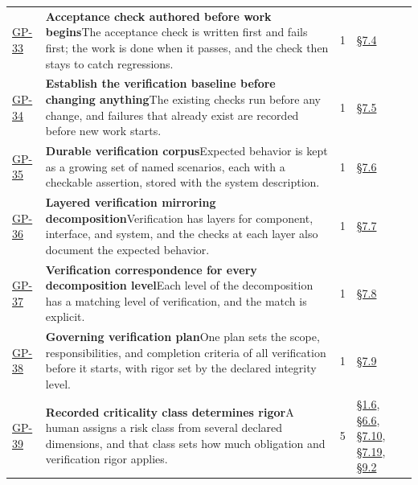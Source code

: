 \begin{longtable}{@{}p{} p{} r p{}@{}}
\hyperlink{gp-33}{GP-33}\hypertarget{gp-33}{} & \textbf{Acceptance check authored before work begins}\newline The acceptance check is written first and fails first; the work is done when it passes, and the check then stays to catch regressions.\rule[-\normalbaselineskip]{0pt}{0pt} & 1 & \hyperlink{nss-7.4}{\S7.4}\rule[-\normalbaselineskip]{0pt}{0pt} \\
\hyperlink{gp-34}{GP-34}\hypertarget{gp-34}{} & \textbf{Establish the verification baseline before changing anything}\newline The existing checks run before any change, and failures that already exist are recorded before new work starts.\rule[-\normalbaselineskip]{0pt}{0pt} & 1 & \hyperlink{nss-7.5}{\S7.5}\rule[-\normalbaselineskip]{0pt}{0pt} \\
\hyperlink{gp-35}{GP-35}\hypertarget{gp-35}{} & \textbf{Durable verification corpus}\newline Expected behavior is kept as a growing set of named scenarios, each with a checkable assertion, stored with the system description.\rule[-\normalbaselineskip]{0pt}{0pt} & 1 & \hyperlink{nss-7.6}{\S7.6}\rule[-\normalbaselineskip]{0pt}{0pt} \\
\hyperlink{gp-36}{GP-36}\hypertarget{gp-36}{} & \textbf{Layered verification mirroring decomposition}\newline Verification has layers for component, interface, and system, and the checks at each layer also document the expected behavior.\rule[-\normalbaselineskip]{0pt}{0pt} & 1 & \hyperlink{nss-7.7}{\S7.7}\rule[-\normalbaselineskip]{0pt}{0pt} \\
\hyperlink{gp-37}{GP-37}\hypertarget{gp-37}{} & \textbf{Verification correspondence for every decomposition level}\newline Each level of the decomposition has a matching level of verification, and the match is explicit.\rule[-\normalbaselineskip]{0pt}{0pt} & 1 & \hyperlink{nss-7.8}{\S7.8}\rule[-\normalbaselineskip]{0pt}{0pt} \\
\hyperlink{gp-38}{GP-38}\hypertarget{gp-38}{} & \textbf{Governing verification plan}\newline One plan sets the scope, responsibilities, and completion criteria of all verification before it starts, with rigor set by the declared integrity level.\rule[-\normalbaselineskip]{0pt}{0pt} & 1 & \hyperlink{nss-7.9}{\S7.9}\rule[-\normalbaselineskip]{0pt}{0pt} \\
\hyperlink{gp-39}{GP-39}\hypertarget{gp-39}{} & \textbf{Recorded criticality class determines rigor}\newline A human assigns a risk class from several declared dimensions, and that class sets how much obligation and verification rigor applies.\rule[-\normalbaselineskip]{0pt}{0pt} & 5 & \hyperlink{nss-1.6}{\S1.6}, \hyperlink{nss-6.6}{\S6.6}, \hyperlink{nss-7.10}{\S7.10}, \hyperlink{nss-7.19}{\S7.19}, \hyperlink{nss-9.2}{\S9.2}\rule[-\normalbaselineskip]{0pt}{0pt} \\

\end{longtable}

